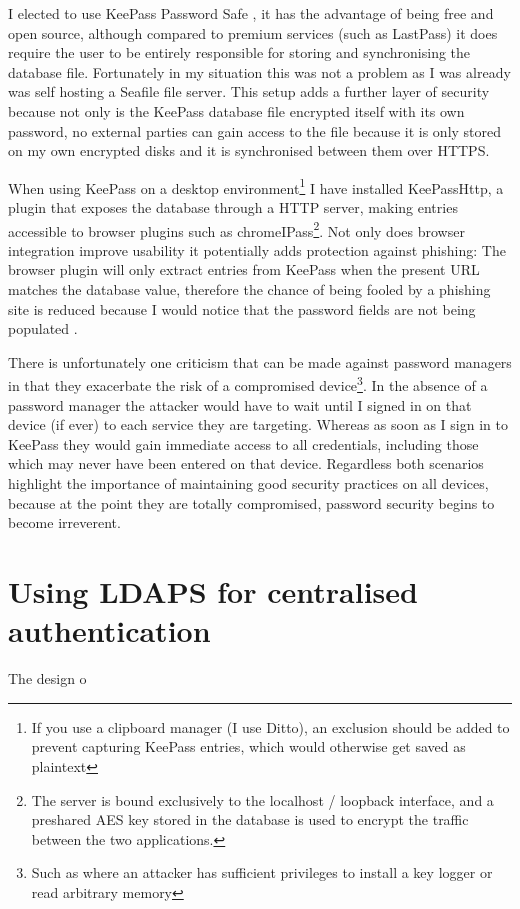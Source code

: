 \documentclass[11pt,a4paper]{scrartcl}
\begin{document}
\begin{refsection}
I elected to use KeePass Password Safe \cite{keepass_home}, it has the advantage of being free and open source, although compared to premium services (such as LastPass) it does require the user to be entirely responsible for storing and synchronising the database file. Fortunately in my situation this was not a problem as I was already was self hosting a Seafile file server. This setup adds a further layer of security because not only is the KeePass database file encrypted itself with its own password, no external parties can gain access to the file because it is only stored on my own encrypted disks and it is synchronised between them over HTTPS.

When using KeePass on a desktop environment\footnote{If you use a clipboard manager (I use Ditto), an exclusion should be added to prevent capturing KeePass entries, which would otherwise get saved as plaintext} 
I have installed KeePassHttp, a plugin that exposes the database through a HTTP server, making entries accessible to browser plugins such as chromeIPass\footnote{The server is bound exclusively to the localhost / loopback interface, and a preshared AES key stored in the database is used to encrypt the traffic between the two applications.}. Not only does browser integration improve usability it  potentially adds protection against phishing: The browser plugin will only extract entries from KeePass when the present URL matches the database value, therefore the chance of being fooled by a phishing site is reduced because I would notice that the password fields are not being populated \cite{ncsc_pass_managers}.

There is unfortunately one criticism that can be made against password managers in that they exacerbate the risk of a compromised device\footnote{Such as where an attacker has sufficient privileges to install a key logger or read arbitrary memory}.
In the absence of a password manager the attacker would have to wait until I signed in on that device (if ever) to each service they are targeting. Whereas as soon as I sign in to KeePass they would gain immediate access to all credentials, including those which may never have been entered on that device. Regardless both scenarios highlight the importance of maintaining good security practices on all devices, because at the point they are totally compromised, password security begins to become irreverent.

\printbibliography
\end{refsection}

\newpage

\section*{Using LDAPS for centralised authentication}
\begin{refsection}
	
The design o

\printbibliography
\end{refsection}
\end{document}
